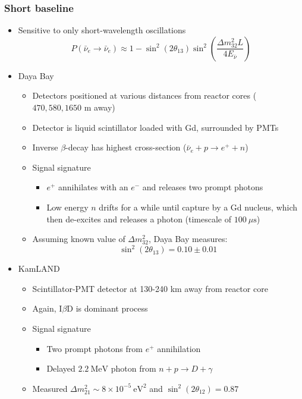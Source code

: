 \documentclass[11pt]{article}
\newcommand{\nubar}{{\bar{\nu}}}
\newcommand{\ev}{\text{eV}}
\newcommand{\mus}{\mu\text{s}}
\newcommand{\mev}{\text{MeV}}
\newcommand{\el}{\ensuremath{e^{-}}\xspace}
\newcommand{\pos}{\ensuremath{e^{+}}\xspace}
\begin{document}
\subsubsection{Short baseline}
\begin{itemize}
  \item Sensitive to only short-wavelength oscillations
  \begin{equation}
    P(\nubar_e\rightarrow \nubar_e) \approx 1- \sin^2(2\theta_{13}) \sin^2 \left(\frac{\Delta m_{32}^2 L}{4E_\nubar}\right)
  \end{equation}
  \item Daya Bay
  \begin{itemize}
    \item Detectors positioned at various distances from reactor cores ($470, 580, 1650$ m away)
    \item Detector is liquid scintillator loaded with Gd, surrounded by PMTs
    \item Inverse $\beta$-decay has highest cross-section ($\nubar_e+p\rightarrow \pos+n$)
    \item Signal signature
    \begin{itemize}
      \item $\pos$ annihilates with an $\el$ and releases two prompt photons
      \item Low energy $n$ drifts for a while until capture by a Gd nucleus, which then de-excites and releases a photon (timescale of $100~\mus$)
    \end{itemize}
    \item Assuming known value of $\Delta m_{32}^2$, Daya Bay measures:
    \begin{equation}
      \sin^2(2\theta_{13}) = 0.10 \pm 0.01
    \end{equation}
  \end{itemize}
  \item KamLAND
  \begin{itemize}
    \item Scintillator-PMT detector at 130-240 km away from reactor core
    \item Again, I$\beta$D is dominant process
    \item Signal signature
    \begin{itemize}
      \item Two prompt photons from $\pos$ annihilation
      \item Delayed $2.2~\mev$ photon from $n+p\rightarrow D+\gamma$
    \end{itemize}
    \item Measured $\Delta m_{21}^2\sim 8\times 10^{-5}~\ev^2$ and $\sin^2(2\theta_{12})=0.87$
  \end{itemize}
\end{itemize}
\end{document}
